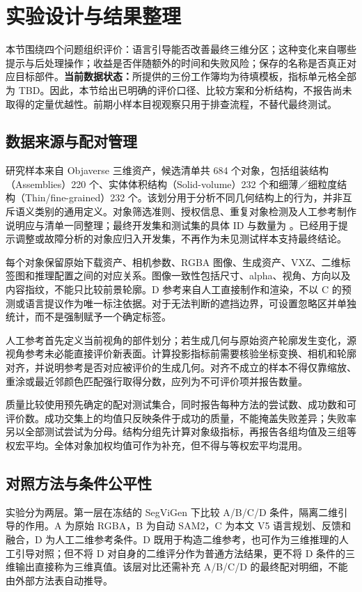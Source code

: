 \section{实验设计与结果整理}
\label{sec:experiments}
本节围绕四个问题组织评价：语言引导能否改善最终三维分区；这种变化来自哪些提示与后处理操作；收益是否伴随额外的时间和失败风险；保存的名称是否真正对应目标部件。\textbf{当前数据状态：}所提供的三份工作簿均为待填模板，指标单元格全部为 TBD。因此，本节给出已明确的评价口径、比较方案和分析结构，不报告尚未取得的定量优越性。前期小样本目视观察只用于排查流程，不替代最终测试。

\subsection{数据来源与配对管理}
研究样本来自 Objaverse 三维资产，候选清单共 684 个对象，包括组装结构（Assemblies）220 个、实体体积结构（Solid-volume）232 个和细薄／细粒度结构（Thin/fine-grained）232 个。该划分用于分析不同几何结构上的行为，并非互斥语义类别的通用定义。对象筛选准则、授权信息、重复对象检测及人工参考制作说明应与清单一同整理；最终开发集和测试集的具体 ID 与数量为 。已经用于提示调整或故障分析的对象应归入开发集，不再作为未见测试样本支持最终结论。

每个对象保留原始下载资产、相机参数、RGBA 图像、生成资产、VXZ、二维标签图和推理配置之间的对应关系。图像一致性包括尺寸、alpha、视角、方向以及内容指纹，不能只比较前景轮廓。D 参考来自人工直接制作和渲染，不以 C 的预测或语言提议作为唯一标注依据。对于无法判断的遮挡边界，可设置忽略区并单独统计，而不是强制赋予一个确定标签。

人工参考首先定义当前视角的部件划分；若生成几何与原始资产轮廓发生变化，源视角参考未必能直接评价新表面。计算投影指标前需要核验坐标变换、相机和轮廓对齐，并说明参考是否对应被评价的生成几何。对齐不成立的样本不得仅靠缩放、重涂或最近邻颜色匹配强行取得分数，应列为不可评价项并报告数量。

质量比较使用预先确定的配对测试集合，同时报告每种方法的尝试数、成功数和可评价数。成功交集上的均值只反映条件于成功的质量，不能掩盖失败差异；失败率另以全部测试尝试为分母。结构分组先计算对象级指标，再报告各组均值及三组等权宏平均。全体对象加权均值可作为补充，但不得与等权宏平均混用。

\subsection{对照方法与条件公平性}
实验分为两层。第一层在冻结的 SegViGen 下比较 A/B/C/D 条件，隔离二维引导的作用。A 为原始 RGBA，B 为自动 SAM2，C 为本文 V5 语言规划、反馈和融合，D 为人工二维参考条件。D 既用于构造二维参考，也可作为三维推理的人工引导对照；但不将 D 对自身的二维评分作为普通方法结果，更不将 D 条件的三维输出直接称为三维真值。该层对比还需补充 A/B/C/D 的最终配对明细，不能由外部方法表自动推导。

